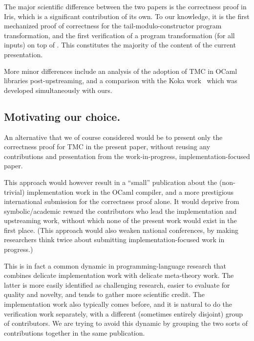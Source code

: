 The major scientific difference between the two papers is the
correctness proof in Iris, which is a significant contribution of its
own. To our knowledge, it is the first mechanized proof of correctness
for the tail-modulo-constructor program transformation, and the first
verification of a program transformation (for all inputs) on top of
\Simuliris. This constitutes the majority of the content of the
current presentation.

More minor differences include an analysis of the adoption of TMC in
OCaml libraries post-upstreaming, and a comparison with the Koka
work~\citep*{tmc-koka-2023} which was developed simultaneously with
ours.

\subsection{Motivating our choice.}

An alternative that we of course considered would be to present only
the correctness proof for TMC in the present paper, without reusing
any contributions and presentation from the work-in-progress,
implementation-focused paper.

This approach would however result in a ``small'' publication about
the (non-trivial) implementation work in the OCaml compiler, and
a more prestigious international submission for the correctness proof
alone. It would deprive from symbolic/academic reward the contributors
who lead the implementation and upstreaming work, without which none
of the present work would exist in the first place. (This approach
would also weaken national conferences, by making researchers think
twice about submitting implementation-focused work in progress.)

This is in fact a common dynamic in programming-language research that
combines delicate implementation work with delicate meta-theory
work. The latter is more easily identified as challenging research,
easier to evaluate for quality and novelty, and tends to gather more
scientific credit. The implementation work also typically comes
before, and it is natural to do the verification work separately, with
a different (sometimes entirely disjoint) group of contributors. We
are trying to avoid this dynamic by grouping the two sorts of
contributions together in the same publication.

